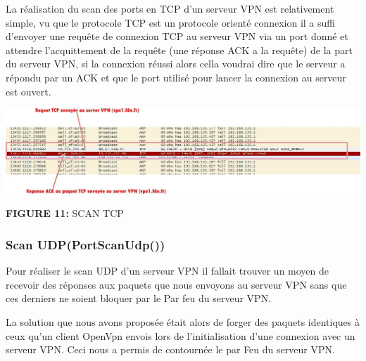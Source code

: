\documentclass[12pt,a4paper]{article}
\begin{document}
La réalisation du scan des ports en TCP d’un serveur VPN est relativement simple, vu que le protocole TCP est un protocole orienté connexion il a suffi d’envoyer une requête de connexion TCP au serveur VPN via un port donné et attendre l’acquittement de la requête (une réponse ACK a la requête) de la part du serveur VPN, si la connexion réussi alors cella voudrai dire que le serveur a répondu par un ACK et que le port utilisé pour lancer la connexion au serveur est ouvert. 
\begin{center}
{\textbf{FIGURE 11:} SCAN TCP}
\end{center}


\subsubsection{Scan UDP(PortScanUdp())}
Pour réaliser le scan UDP d’un serveur VPN il fallait trouver un moyen de recevoir des réponses aux paquets que nous envoyons au serveur VPN sans que ces derniers ne soient bloquer par le 
Par feu du serveur VPN.

La solution que nous avons proposée était alors de forger des paquets identiques à ceux qu’un client OpenVpn envois lors de l’initialisation d’une connexion avec un serveur VPN. Ceci nous a permis de contournée le par Feu du serveur VPN. 
\end{document}
